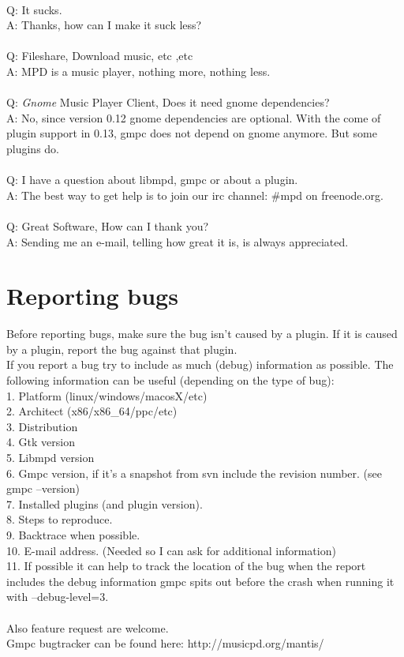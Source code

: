 \documentclass{article}
\begin{document}
\\
Q: It sucks.\\
A: Thanks, how can I make it suck less?\\
\\
Q: Fileshare, Download music, etc ,etc\\
A: MPD is a music player, nothing more, nothing less.\\
\\
Q: \emph{Gnome} Music Player Client, Does it need gnome dependencies?\\
A: No, since version 0.12 gnome dependencies are optional. With the come of plugin support in 0.13, gmpc does not depend on gnome anymore. But some plugins do.\\
\\
Q: I have a question about libmpd, gmpc or about a plugin.\\
A: The best way to get help is to join our irc channel: \#mpd on freenode.org.\\
\\
Q: Great Software, How can I thank you?\\
A: Sending me an e-mail, telling how great it is, is always appreciated.\\


\section{Reporting bugs}
Before reporting bugs, make sure the bug isn't caused by a plugin. If it is caused by a plugin, report the bug against that plugin.\\
If you report a bug try to include as much (debug) information as possible. The following information can be useful (depending on the type of bug):\\
1. Platform (linux/windows/macosX/etc)\\
2. Architect (x86/x86\_64/ppc/etc)\\
3. Distribution\\
4. Gtk version\\
5. Libmpd version\\
6. Gmpc version, if it's a snapshot from svn include the revision number. (see gmpc --version)\\
7. Installed plugins (and plugin version).\\
8. Steps to reproduce.\\
9. Backtrace when possible.\\
10. E-mail address. (Needed so I can ask for additional information)\\
11. If possible it can help to track the location of the bug when the report includes the debug information gmpc spits out before the crash when running it with --debug-level=3.\\
\\
Also feature request are welcome.\\
Gmpc bugtracker can be found here: http://musicpd.org/mantis/\\
\end{document}
